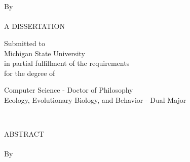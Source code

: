 \documentclass[12pt,letterpaper,twoside]{report}
\begin{document}
\sloppy
{}


\begin{titlepage}
\begin{center}
\ \\[1in]%
\MakeUppercase{\thesisTitle}\\
\begin{doublespace}
By\\ %
\authorName \\[4.5 in]%
A DISSERTATION \\ %
\end{doublespace}

Submitted to \\ Michigan State University \\ in partial
fulfillment of the requirements \\
for the degree of\\
\begin{doublespace}
\end{doublespace}


Computer Science - Doctor of Philosophy \\
Ecology, Evolutionary Biology, and Behavior - Dual Major
\vspace{\baselineskip}

\graduationYear\\

\end{center}
\end{titlepage}
\newpage

\thispagestyle{empty} \setcounter{page}{4}
\begin{doublespace}
\begin{centering}
ABSTRACT \\ %
\MakeUppercase{\thesisTitle} \\ %
By \\ %
\authorName \\ %
\end{centering}



\end{doublespace}
\newpage
\addtocounter{page}{-2}%
\end{document}
